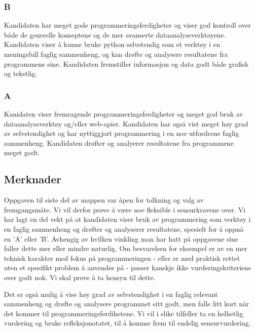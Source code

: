 \documentclass[12pt, titlepage]{article}
\begin{document}
\subsubsection*{B}
Kandidaten har meget gode programmeringsferdigheter og viser god kontroll over både de generelle konseptene og de mer avanserte dataanalyseverktøyene.
Kandidaten viser å kunne bruke python selvstendig som et verktøy i en meningsfull faglig sammenheng, og kan drøfte og analysere resultatene fra programmene sine.
Kandidaten fremstiller informasjon og data godt både grafisk og tekstlig.

\subsubsection*{A}
Kanidaten viser fremragende programmeringsferdigheter og meget god bruk av dataanalyseverktøy og/eller web-apier. 
Kandidaten har også vist meget høy grad av selvstendighet og har nyttiggjort programmering i en noe utfordrene faglig sammenheng.
Kandidaten drøfter og analyerer resultatene fra programmene meget godt.

\subsection*{Merknader}
Oppgaven til siste del av mappen var åpen for tolkning og valg av fremgangsmåte. Vi vil derfor prøve å være noe fleksible i sensurkravene over. 
Vi har lagt en del vekt på at kandidaten viser bruk av programmering som verktøy i en faglig sammenheng og drøfter og analyserer resultatene, spesielt
for å oppnå en 'A' eller 'B'. Avhengig av hvilken vinkling man har hatt på oppgavene sine faller dette mer eller mindre naturlig. Om besvarelsen for eksempel er
av en mer teknisk karakter med fokus på programmeringen - eller er med praktisk rettet uten et spesifikt problem å anvendes på - passer kanskje ikke vurderingskriteriene over godt nok.
Vi skal prøve å ta hensyn til dette.

Det er også mulig å vise høy grad av selvstendighet i en faglig relevant sammenheng og drøfte og analysere programmet sitt godt, men falle litt kort når det kommer til programmeringsferdihetene.
Vi vil i slike tilfeller ta en helhetlig vurdering og bruke refleksjonotatet, til å komme frem til endelig sensurvurdering.
\end{document}

